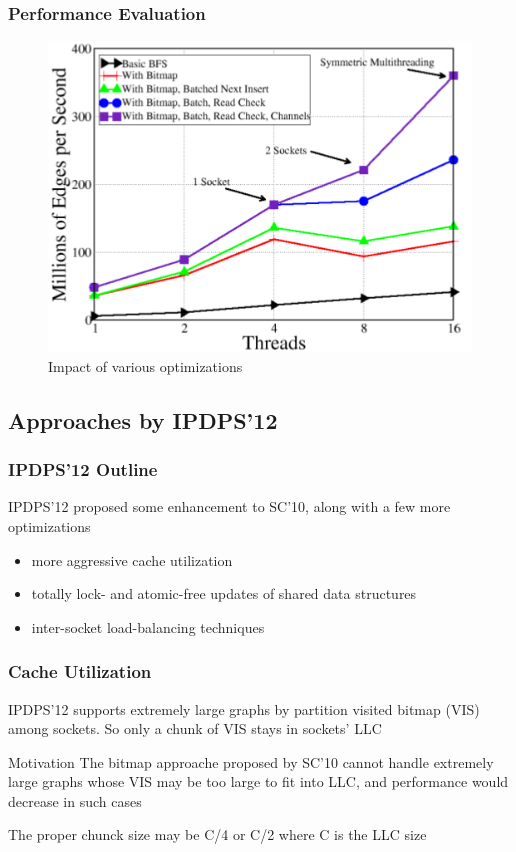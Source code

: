 \documentclass[]{beamer}
\begin{document}
\begin{frame}
  \frametitle{Performance Evaluation}
  \begin{figure}
    \centering
    \includegraphics[width=.5\textwidth]{figures/sc10-evaluation}
    \caption{Impact of various optimizations}
  \end{figure}
\end{frame}

\subsection{Approaches by IPDPS'12}

\begin{frame}
  \frametitle{IPDPS'12 Outline}
  IPDPS'12 proposed some enhancement to SC'10, along with a few more optimizations
  \begin{itemize}
    \item more aggressive cache utilization
    \item totally lock- and atomic-free updates of shared data structures
    \item inter-socket load-balancing techniques
  \end{itemize}
\end{frame}

\begin{frame}
  \frametitle{Cache Utilization}
  IPDPS'12 supports extremely large graphs by partition visited bitmap (VIS) among sockets.
  So only a chunk of VIS stays in sockets' LLC
  \begin{block}{Motivation}
  The bitmap approache proposed by SC'10 cannot handle extremely large graphs whose
  VIS may be too large to fit into LLC, and performance would decrease
  in such cases
  \end{block}
  The proper chunck size may be C/4 or C/2 where C is the LLC size
\end{frame}
\end{document}
